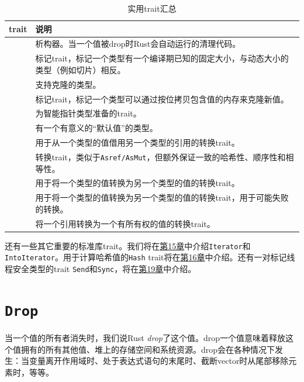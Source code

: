 \begin{table}[htbp]
    \centering
    \caption{实用trait汇总}
    \label{t13-1}
    \begin{tabular}{p{}p{}}
        \hline
        \textbf{trait}  & \textbf{说明} \\
        \hline

        \nameref{drop}  & 析构器。当一个值被drop时Rust会自动运行的清理代码。    \\
        \rowcolor{tablecolor}
        \nameref{sized} & 标记trait，标记一个类型有一个编译期已知的固定大小，与动态大小的类型（例如切片）相反。 \\
        \nameref{clone} & 支持克隆的类型。  \\
        \rowcolor{tablecolor}
        \nameref{Copy}  & 标记trait，标记一个类型可以通过按位拷贝包含值的内存来克隆新值。   \\
        \nameref{deref} & 为智能指针类型准备的trait。   \\
        \rowcolor{tablecolor}
        \nameref{default}   & 有一个有意义的“默认值”的类型。    \\
        \nameref{asref} & 用于从一个类型的值借用另一个类型的引用的转换trait。   \\
        \rowcolor{tablecolor}
        \nameref{borrow}& 转换trait，类似于\texttt{Asref/AsMut}，但额外保证一致的哈希性、顺序性和相等性。   \\
        \nameref{from}  & 用于将一个类型的值转换为另一个类型的值的转换trait。   \\
        \rowcolor{tablecolor}
        \nameref{tryfrom}   & 用于将一个类型的值转换为另一个类型的值的转换trait，用于可能失败的转换。   \\
        \nameref{toowned}   & 将一个引用转换为一个有所有权的值的转换trait。 \\
    \end{tabular}
\end{table}

还有一些其它重要的标准库trait。我们将在\hyperref[ch15]{第15章}中介绍\texttt{Iterator}和\texttt{IntoIterator}。用于计算哈希值的\texttt{Hash} trait将在\hyperref[ch16]{第16章}中介绍。还有一对标记线程安全类型的trait \texttt{Send}和\texttt{Sync}，将在\hyperref[ch19]{第19章}中介绍。

\section{\texttt{Drop}}\label{drop}

当一个值的所有者消失时，我们说Rust \emph{drop}了这个值。drop一个值意味着释放这个值拥有的所有其他值、堆上的存储空间和系统资源。drop会在各种情况下发生：当变量离开作用域时、处于表达式语句的末尾时、截断vector时从尾部移除元素时，等等。

